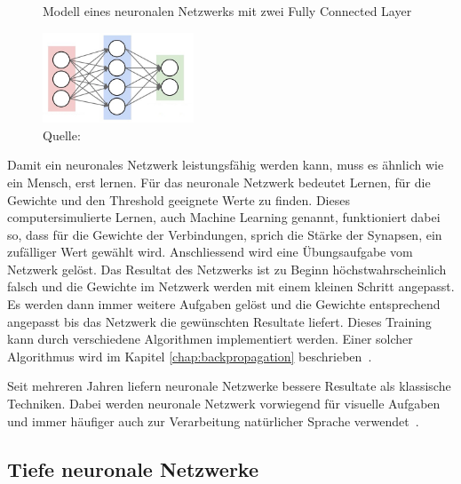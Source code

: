 \begin{figure}[h!]
    \captionsetup{width=.9\linewidth}
    \caption{Modell eines neuronalen Netzwerks mit zwei Fully Connected Layer}
    \label{fig:cs231-nn}
    \centering
    \includegraphics[width=0.4\textwidth]{graphics/cs231-nn.jpg}
    \vspace*{0.3cm}
    \caption*{Quelle: \textcite{cs231NN}}
\end{figure}

Damit ein neuronales Netzwerk leistungsfähig werden kann, muss es ähnlich wie ein Mensch, erst lernen. Für das neuronale Netzwerk bedeutet Lernen, für die Gewichte und den Threshold geeignete Werte zu finden. Dieses computersimulierte Lernen, auch Machine Learning genannt, funktioniert dabei so, dass für die Gewichte der Verbindungen, sprich die Stärke der Synapsen, ein zufälliger Wert gewählt wird. Anschliessend wird eine Übungsaufgabe vom Netzwerk gelöst. Das Resultat des Netzwerks ist zu Beginn höchstwahrscheinlich falsch und die Gewichte im Netzwerk werden mit einem kleinen Schritt angepasst. Es werden dann immer weitere Aufgaben gelöst und die Gewichte entsprechend angepasst bis das Netzwerk die gewünschten Resultate liefert.
Dieses Training kann durch verschiedene Algorithmen implementiert werden. Einer solcher Algorithmus wird im Kapitel \ref{chap:backpropagation} beschrieben~\autocite{Krogh2008}.

Seit mehreren Jahren liefern neuronale Netzwerke bessere Resultate als klassische Techniken. Dabei werden neuronale Netzwerk vorwiegend für visuelle Aufgaben und immer häufiger auch zur Verarbeitung natürlicher Sprache verwendet~\autocite{Olah2014b}.



\subsection{Tiefe neuronale Netzwerke}
\label{chap:deep-neural-nets}


